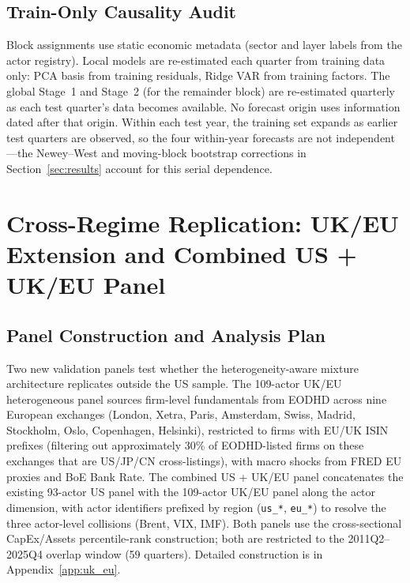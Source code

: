\documentclass[11pt,a4paper]{article}
\begin{document}
\subsection{Train-Only Causality Audit}

Block assignments use static economic metadata (sector and layer labels from the actor registry). Local models are re-estimated each quarter from training data only: PCA basis from training residuals, Ridge VAR from training factors. The global Stage~1 and Stage~2 (for the remainder block) are re-estimated quarterly as each test quarter's data becomes available. No forecast origin uses information dated after that origin. Within each test year, the training set expands as earlier test quarters are observed, so the four within-year forecasts are not independent---the Newey--West and moving-block bootstrap corrections in Section~\ref{sec:results} account for this serial dependence.


\section{Cross-Regime Replication: UK/EU Extension and Combined US + UK/EU Panel}
\label{sec:cross_regime}

\subsection{Panel Construction and Analysis Plan}

Two new validation panels test whether the heterogeneity-aware mixture architecture replicates outside the US sample. The 109-actor UK/EU heterogeneous panel sources firm-level fundamentals from EODHD across nine European exchanges (London, Xetra, Paris, Amsterdam, Swiss, Madrid, Stockholm, Oslo, Copenhagen, Helsinki), restricted to firms with EU/UK ISIN prefixes (filtering out approximately 30\% of EODHD-listed firms on these exchanges that are US/JP/CN cross-listings), with macro shocks from FRED EU proxies and BoE Bank Rate. The combined US + UK/EU panel concatenates the existing 93-actor US panel with the 109-actor UK/EU panel along the actor dimension, with actor identifiers prefixed by region (\texttt{us\_*}, \texttt{eu\_*}) to resolve the three actor-level collisions (Brent, VIX, IMF). Both panels use the cross-sectional CapEx/Assets percentile-rank construction; both are restricted to the 2011Q2--2025Q4 overlap window (59 quarters). Detailed construction is in Appendix~\ref{app:uk_eu}.
\end{document}
